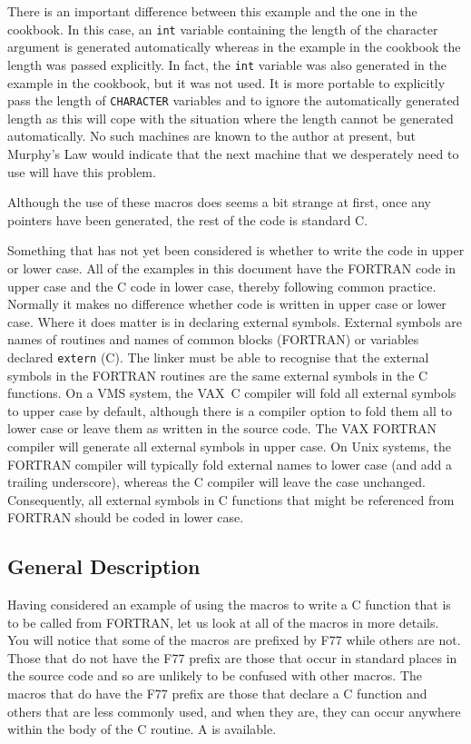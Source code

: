 \documentclass[twoside,11pt,nolof]{starlink}
\newcounter{examples}
\begin{document}
There is an important difference between this example and the one in the
cookbook. In this case, an \texttt{int} variable containing the length of the
character argument is generated automatically whereas in the example in the
cookbook the length was passed explicitly.
In fact, the \texttt{int} variable was
also generated in the example in the cookbook, but it was not used. It is more
portable to explicitly pass the length of \texttt{CHARACTER} variables and to
ignore the automatically generated length as this will cope with the situation
where the length cannot be generated automatically.
No such machines are known to the
author at present, but Murphy's Law would indicate that the next machine that
we desperately need to use will have this problem.

Although the use of these macros does seems a bit strange at first, once any
pointers have been generated, the rest of the code is standard C\@.

Something that has not yet been considered is whether to write the code in
upper or lower case. All of the examples in this document have the FORTRAN code
in upper case and the C code in lower case, thereby following common practice.
Normally it makes no difference whether code is written in upper case or lower
case. Where it does matter is in declaring external symbols. External symbols
are names of routines and names of common blocks (FORTRAN) or variables
declared \texttt{extern} (C). The linker must be able to recognise that the
external symbols in the FORTRAN routines are the same external symbols in the C
functions. On a VMS system, the VAX~C compiler will fold all external symbols
to upper case by default, although there is a compiler option to fold them all
to lower case or leave them as written in the source code. The VAX FORTRAN
compiler will generate all external symbols in upper case. On Unix systems, the
FORTRAN compiler will typically fold external names to lower case (and add a
trailing underscore), whereas the C compiler will leave the case unchanged.
Consequently, all external symbols in C functions that might be referenced from
FORTRAN should be coded in lower case.

\subsection{General Description}

Having considered an example of using the macros to write a C function that is
to be called from FORTRAN, let us look at all of the macros in more details.
You will notice that some of the macros are prefixed by F77 while others are
not. Those that do not have the F77 prefix are those that occur in standard
places in the source code and so are unlikely to be confused with other macros.
The macros that do have the F77 prefix are those that declare a C function and
others that are less commonly used, and when they are, they can occur anywhere
within the body of the C routine.
A
 is
available.
\end{document}
